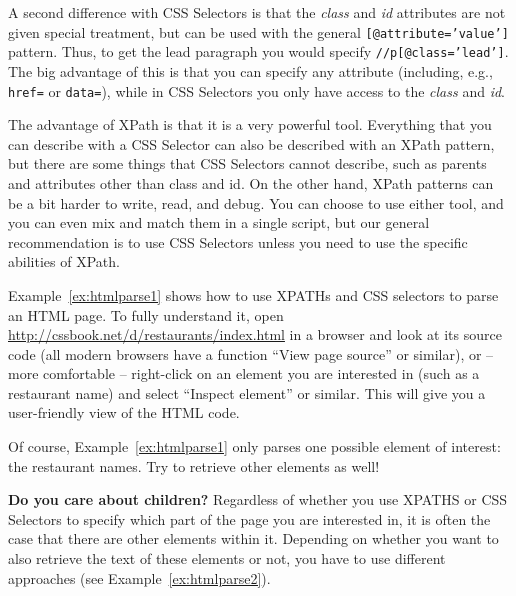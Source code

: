 A second difference with CSS Selectors is that the \emph{class} and \emph{id} attributes are not given special treatment,
but can be used with the general \texttt{\small{[@attribute='value']}} pattern.
Thus, to get the lead paragraph you would specify \texttt{\small{//p[@class='lead']}}.
The big advantage of this is that you can specify any attribute (including, e.g., \texttt{\small{href=}} or \texttt{\small{data=}}),
while in CSS Selectors you only have access to the \emph{class} and \emph{id}.

The advantage of XPath is that it is a very powerful tool.
Everything that you can describe with a CSS Selector can also be described with an XPath pattern,
but there are some things that CSS Selectors cannot describe,
such as parents and attributes other than class and id.
On the other hand, XPath patterns can be a bit harder to write, read, and debug.
You can choose to use either tool, and you can even mix and match them in a single script,
but our general recommendation is to use CSS Selectors unless you need to use the specific abilities of XPath.

Example~\ref{ex:htmlparse1} shows how to use XPATHs and CSS selectors to parse
an HTML page. To fully understand it, open
\url{http://cssbook.net/d/restaurants/index.html} in a browser and
look at its source code (all modern browsers have a function ``View
page source'' or similar), or -- more comfortable -- right-click on an
element you are interested in (such as a restaurant name) and select
``Inspect element'' or similar. This will give you a user-friendly
view of the HTML code.



Of course, Example~\ref{ex:htmlparse1} only parses one possible element of interest: the restaurant names. Try to retrieve other elements as well!

\begin{feature}\textbf{Do you care about children?}
Regardless of whether you use XPATHS or CSS Selectors to specify which part of the page you are interested in, it is often the case that there are other elements within it. Depending on whether you want to also retrieve the text of these elements or not, you have to use different approaches (see Example~\ref{ex:htmlparse2}).
\end{feature}



